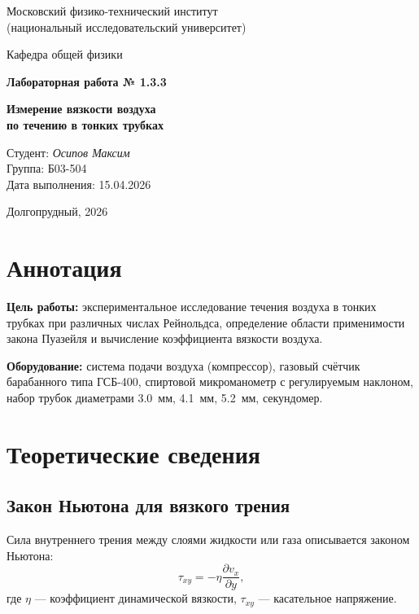 \documentclass[12pt,a4paper]{article}
\begin{document}
\begin{titlepage}
    \centering
    \vspace*{2cm}
    {\Large Московский физико-технический институт\\[0.5ex]
    (национальный исследовательский университет)\par}
    \vspace{1cm}
    {\large Кафедра общей физики\par}
    \vspace{2cm}
    {\LARGE \textbf{Лабораторная работа № 1.3.3}\par}
    \vspace{1cm}
    {\huge \textbf{Измерение вязкости воздуха\\ по течению в тонких трубках}\par}
    \vspace{3cm}
    \begin{flushright}
        \large
        Студент: \textit{Осипов Максим}\\
        Группа: Б03-504\\
        Дата выполнения: 15.04.2026
    \end{flushright}
    \vfill
    Долгопрудный, 2026
\end{titlepage}

\section*{Аннотация}
\textbf{Цель работы:} экспериментальное исследование течения воздуха в тонких трубках при различных числах Рейнольдса, определение области применимости закона Пуазейля и вычисление коэффициента вязкости воздуха.

\textbf{Оборудование:} система подачи воздуха (компрессор), газовый счётчик барабанного типа ГСБ-400, спиртовой микроманометр с регулируемым наклоном, набор трубок диаметрами \qty{3.0}{мм}, \qty{4.1}{мм}, \qty{5.2}{мм}, секундомер.


\section{Теоретические сведения}

\subsection{Закон Ньютона для вязкого трения}
Сила внутреннего трения между слоями жидкости или газа описывается законом Ньютона:
\begin{equation}
    \tau_{xy} = -\eta \frac{\partial v_x}{\partial y},
\end{equation}
где $\eta$ — коэффициент динамической вязкости, $\tau_{xy}$ — касательное напряжение.
\end{document}
